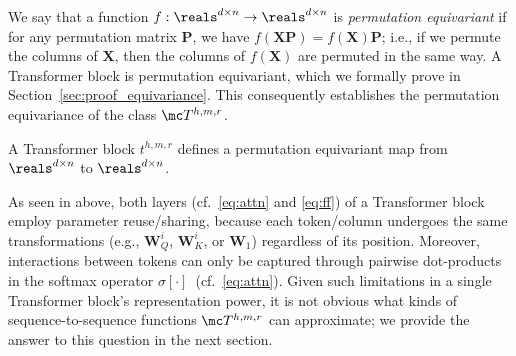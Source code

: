 \documentclass{article} %
\def\mE{{\bm{E}}}
\def\mP{{\bm{P}}}
\def\mW{{\bm{W}}}
\def\mX{{\bm{X}}}
\newcommand{\sfmx}{\sigma}
\begin{document}
We say that a function $f : \reals^{d \times n} \to \reals^{d \times n}$ is {\em permutation equivariant} if for any permutation matrix $\mP$, we have $f(\mX \mP) = f(\mX) \mP$; i.e., if we permute the columns of $\mX$, then the columns of $f(\mX)$ are permuted in the same way. A Transformer block is permutation equivariant, which we formally prove in Section~\ref{sec:proof_equivariance}. This consequently establishes the permutation equivariance of the class $\mc T^{h,m,r}$. 
\begin{claim}
\label{claim:equivariance}
A Transformer block $t^{h, m, r}$ defines a permutation equivariant map from $\reals^{d \times n}$ to $\reals^{d \times n}$.
\end{claim}

As seen in above, both layers (cf.~\eqref{eq:attn} and \eqref{eq:ff}) of a Transformer block employ parameter reuse/sharing, because each token/column undergoes the same transformations (e.g., $\mW_Q^i$, $\mW_K^i$, or $\mW_1$) regardless of its position.
Moreover, interactions between tokens can only be captured through pairwise dot-products in the softmax operator $\sfmx[\cdot]$~(cf.~\eqref{eq:attn}).
Given such limitations in a single Transformer block's representation power, it is not obvious what kinds of sequence-to-sequence functions $\mc T^{h,m,r}$ can approximate; we provide the answer to this question in the next section.







\vspace*{-5pt}
\end{document}

